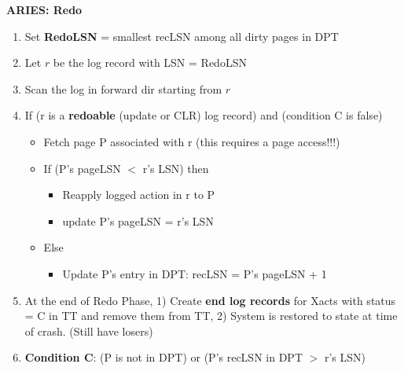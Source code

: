 \documentclass[8pt, landscape]{extarticle}
\begin{document}
\begin{multicols*}{4}
  \textbf{ARIES: Redo}
  \begin{enumerate}
    \item Set \textbf{RedoLSN} = smallest recLSN among all dirty pages in DPT
    \item Let $r$ be the log record with LSN = RedoLSN
    \item Scan the log in forward dir starting from $r$
    \item If (r is a \textbf{redoable} (update or CLR) log record) and (condition C is false)
    \begin{itemize}
      \item Fetch page P associated with r (this requires a page access!!!)
      \item If (P's pageLSN $<$ r's LSN) then
      \begin{itemize}
        \item Reapply logged action in r to P
        \item update P's pageLSN = r's LSN
      \end{itemize}
      \item Else
      \begin{itemize}
        \item Update P's entry in DPT: recLSN = P's pageLSN + 1
      \end{itemize}
    \end{itemize}
    \item At the end of Redo Phase, 1) Create \textbf{end log records} for Xacts with status = C in TT and remove them from TT, 2) System is restored to state at time of crash. (Still have losers)
    \item \textbf{Condition C}: (P is not in DPT) or (P's recLSN in DPT $>$ r's LSN)
  \end{enumerate}


\end{multicols*}
\end{document}

